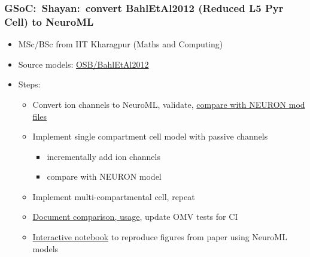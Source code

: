 \begin{frame}[c]
  \frametitle{GSoC:\ Shayan:\ convert BahlEtAl2012 (Reduced L5 Pyr Cell) to NeuroML}
  \begin{itemize}
    \item MSc/BSc from IIT Kharagpur (Maths and Computing)
      \pause{}
    \item Source models: \href{https://github.com/OpenSourceBrain/BahlEtAl2012_ReducedL5PyrCell}{OSB/BahlEtAl2012}
      \pause{}
    \item Steps:
      \begin{itemize}
        \item Convert ion channels to NeuroML, validate, \href{https://github.com/OpenSourceBrain/BahlEtAl2012_ReducedL5PyrCell/tree/master/NeuroML2/compare_nml2_mods}{compare with NEURON mod files}
        \item Implement single compartment cell model with passive channels
          \begin{itemize}
            \item incrementally add ion channels
            \item compare with NEURON model
          \end{itemize}
        \item Implement multi-compartmental cell, repeat
        \item \href{https://github.com/OpenSourceBrain/BahlEtAl2012_ReducedL5PyrCell/tree/master/NeuroML2}{Document comparison, usage}, update OMV tests for CI
        \item \href{https://github.com/OpenSourceBrain/BahlEtAl2012_ReducedL5PyrCell/blob/master/NeuroML2/interactive_nml.ipynb}{Interactive notebook} to reproduce figures from paper using NeuroML models
      \end{itemize}
  \end{itemize}
\end{frame}
